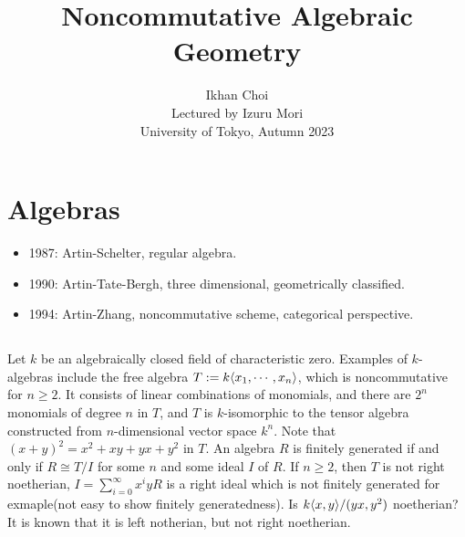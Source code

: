 \documentclass{../../../small}
\begin{document}
\title{Noncommutative Algebraic Geometry}
\author{Ikhan Choi\\Lectured by Izuru Mori\\University of Tokyo, Autumn 2023}
\maketitle

\section{Algebras}


\begin{itemize}
\item 1987: Artin-Schelter, regular algebra.
\item 1990: Artin-Tate-Bergh, three dimensional, geometrically classified.
\item 1994: Artin-Zhang, noncommutative scheme, categorical perspective.
\end{itemize}

\subsection{}
Let $k$ be an algebraically closed field of characteristic zero.
Examples of $k$-algebras include the free algebra $T:=k\langle x_1,\cdots,x_n\rangle$, which is noncommutative for $n\ge2$.
It consists of linear combinations of monomials, and there are $2^n$ monomials of degree $n$ in $T$, and $T$ is $k$-isomorphic to the tensor algebra constructed from $n$-dimensional vector space $k^n$.
Note that $(x+y)^2=x^2+xy+yx+y^2$ in $T$.
An algebra $R$ is finitely generated if and only if $R\cong T/I$ for some $n$ and some ideal $I$ of $R$.
If $n\ge2$, then $T$ is not right noetherian, $I=\sum_{i=0}^\infty x^iyR$ is a right ideal which is not finitely generated for exmaple(not easy to show finitely generatedness).
Is $k\langle x,y\rangle/(yx,y^2)$ noetherian?
It is known that it is left notherian, but not right noetherian.
\end{document}
